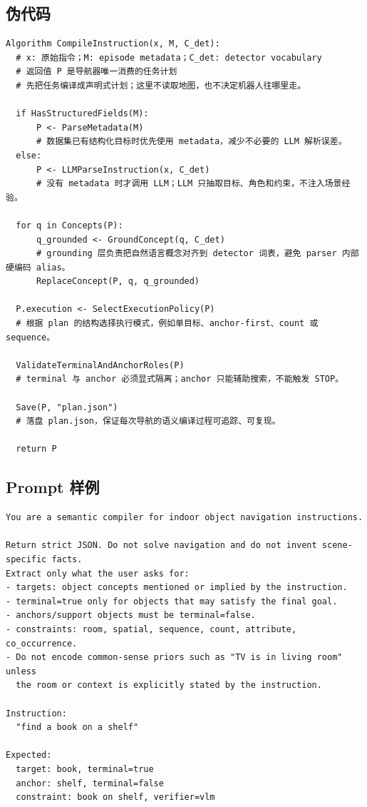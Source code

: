 \documentclass[UTF8,zihao=-4]{ctexart}
\begin{document}
\subsection{伪代码}

\begin{lstlisting}[style=pseudo,caption={指令编译流程}]
Algorithm CompileInstruction(x, M, C_det):
  # x: 原始指令；M: episode metadata；C_det: detector vocabulary
  # 返回值 P 是导航器唯一消费的任务计划
  # 先把任务编译成声明式计划；这里不读取地图，也不决定机器人往哪里走。

  if HasStructuredFields(M):
      P <- ParseMetadata(M)
      # 数据集已有结构化目标时优先使用 metadata，减少不必要的 LLM 解析误差。
  else:
      P <- LLMParseInstruction(x, C_det)
      # 没有 metadata 时才调用 LLM；LLM 只抽取目标、角色和约束，不注入场景经验。

  for q in Concepts(P):
      q_grounded <- GroundConcept(q, C_det)
      # grounding 层负责把自然语言概念对齐到 detector 词表，避免 parser 内部硬编码 alias。
      ReplaceConcept(P, q, q_grounded)

  P.execution <- SelectExecutionPolicy(P)
  # 根据 plan 的结构选择执行模式，例如单目标、anchor-first、count 或 sequence。

  ValidateTerminalAndAnchorRoles(P)
  # terminal 与 anchor 必须显式隔离；anchor 只能辅助搜索，不能触发 STOP。

  Save(P, "plan.json")
  # 落盘 plan.json，保证每次导航的语义编译过程可追踪、可复现。

  return P
\end{lstlisting}

\subsection{Prompt 样例}

\begin{lstlisting}[style=pseudo,caption={Instruction parsing prompt 片段}]
You are a semantic compiler for indoor object navigation instructions.

Return strict JSON. Do not solve navigation and do not invent scene-specific facts.
Extract only what the user asks for:
- targets: object concepts mentioned or implied by the instruction.
- terminal=true only for objects that may satisfy the final goal.
- anchors/support objects must be terminal=false.
- constraints: room, spatial, sequence, count, attribute, co_occurrence.
- Do not encode common-sense priors such as "TV is in living room" unless
  the room or context is explicitly stated by the instruction.

Instruction:
  "find a book on a shelf"

Expected:
  target: book, terminal=true
  anchor: shelf, terminal=false
  constraint: book on shelf, verifier=vlm
\end{lstlisting}
\end{document}
